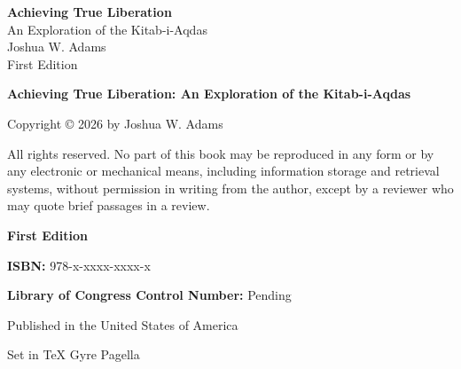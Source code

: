 \frontmatter
\thispagestyle{empty}
\vspace*{2cm}
\begin{center}
{\Huge \textbf{Achieving True Liberation}}\\[1.2cm]
{\Large An Exploration of the Kitab-i-Aqdas}\\[2cm]
{\Large Joshua W. Adams}\\[1cm]
{\large First Edition}
\end{center}
\clearpage

\thispagestyle{empty}
\vspace*{1cm}

\noindent\textbf{Achieving True Liberation: An Exploration of the Kitab-i-Aqdas}

\noindent Copyright © 2026 by Joshua W. Adams

\noindent All rights reserved. No part of this book may be reproduced in any form or by any electronic or mechanical means, including information storage and retrieval systems, without permission in writing from the author, except by a reviewer who may quote brief passages in a review.

\vfill

\noindent \textbf{First Edition}

\noindent \textbf{ISBN:} 978-x-xxxx-xxxx-x

\noindent \textbf{Library of Congress Control Number:} Pending

\noindent Published in the United States of America

\noindent Set in TeX Gyre Pagella

\clearpage